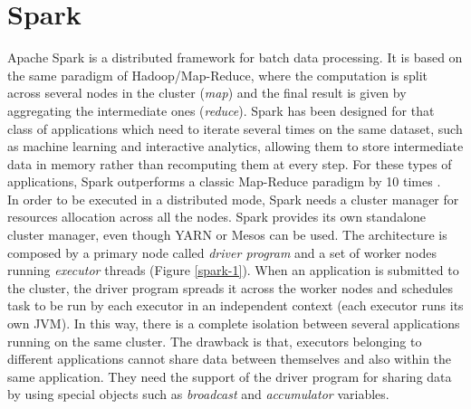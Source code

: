 \section{Spark}
Apache Spark \cite{bib38} is a distributed framework for batch data processing. It is based on the same paradigm of Hadoop/Map-Reduce, where the computation is split across several nodes in the cluster (\textit{map}) and the final result is given by aggregating the intermediate ones (\textit{reduce}). Spark has been designed for that class of applications which need to iterate several times on the same dataset, such as machine learning and interactive analytics, allowing them to store intermediate data in memory rather than recomputing them at every step. For these types of applications, Spark outperforms a classic Map-Reduce paradigm by 10 times \cite{bib21}.\\
In order to be executed in a distributed mode, Spark needs a cluster manager for resources allocation across all the nodes. Spark provides its own standalone cluster manager, even though YARN or Mesos \cite{bib39} can be used. The architecture is composed by a primary node called \textit{driver program} and a set of worker nodes running \textit{executor} threads (Figure \ref{spark-1}). When an application is submitted to the cluster, the driver program spreads it across the worker nodes and schedules task to be run by each executor in an independent context (each executor runs its own JVM). In this way, there is a complete isolation between several applications running on the same cluster. The drawback is that, executors belonging to different applications cannot share data between themselves and also within the same application. They need the support of the driver program for sharing data by using special objects such as \textit{broadcast} and \textit{accumulator} variables.

